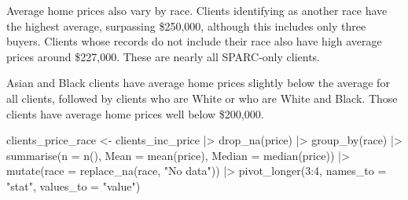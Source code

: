 \documentclass[
  letterpaper,
  DIV=11,
  numbers=noendperiod]{scrartcl}
\newenvironment{Shaded}{\begin{snugshade}}{\end{snugshade}}
\newcommand{\AttributeTok}[1]{\textcolor[rgb]{0.40,0.45,0.13}{#1}}
\newcommand{\DecValTok}[1]{\textcolor[rgb]{0.68,0.00,0.00}{#1}}
\newcommand{\FunctionTok}[1]{\textcolor[rgb]{0.28,0.35,0.67}{#1}}
\newcommand{\NormalTok}[1]{\textcolor[rgb]{0.00,0.23,0.31}{#1}}
\newcommand{\OtherTok}[1]{\textcolor[rgb]{0.00,0.23,0.31}{#1}}
\newcommand{\SpecialCharTok}[1]{\textcolor[rgb]{0.37,0.37,0.37}{#1}}
\newcommand{\StringTok}[1]{\textcolor[rgb]{0.13,0.47,0.30}{#1}}
\begin{document}
Average home prices also vary by race. Clients identifying as another
race have the highest average, surpassing \$250,000, although this
includes only three buyers. Clients whose records do not include their
race also have high average prices around \$227,000. These are nearly
all SPARC-only clients.

Asian and Black clients have average home prices slightly below the
average for all clients, followed by clients who are White or who are
White and Black. Those clients have average home prices well below
\$200,000.

\begin{Shaded}
\begin{Highlighting}[]
\NormalTok{clients\_price\_race }\OtherTok{\textless{}{-}}\NormalTok{ clients\_inc\_price }\SpecialCharTok{|\textgreater{}} 
  \FunctionTok{drop\_na}\NormalTok{(price) }\SpecialCharTok{|\textgreater{}} 
  \FunctionTok{group\_by}\NormalTok{(race) }\SpecialCharTok{|\textgreater{}} 
  \FunctionTok{summarise}\NormalTok{(}\AttributeTok{n =} \FunctionTok{n}\NormalTok{(),}
            \AttributeTok{Mean =} \FunctionTok{mean}\NormalTok{(price),}
            \AttributeTok{Median =} \FunctionTok{median}\NormalTok{(price)) }\SpecialCharTok{|\textgreater{}} 
  \FunctionTok{mutate}\NormalTok{(}\AttributeTok{race =} \FunctionTok{replace\_na}\NormalTok{(race, }\StringTok{"No data"}\NormalTok{)) }\SpecialCharTok{|\textgreater{}} 
  \FunctionTok{pivot\_longer}\NormalTok{(}\DecValTok{3}\SpecialCharTok{:}\DecValTok{4}\NormalTok{, }\AttributeTok{names\_to =} \StringTok{"stat"}\NormalTok{, }\AttributeTok{values\_to =} \StringTok{"value"}\NormalTok{)}


\end{Highlighting}
\end{Shaded}
\end{document}
